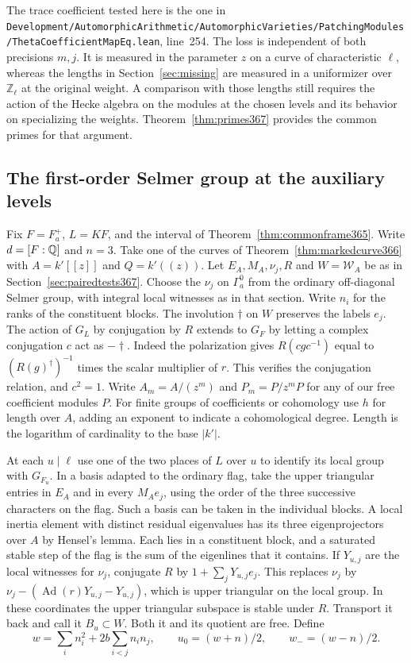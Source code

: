 \documentclass[a4paper,11pt]{article}
\theoremstyle{definition}
\theoremstyle{remark}
\newcommand{\ZZ}{\mathbb Z}\newcommand{\ord}{\operatorname{ord}}
\newcommand{\srcloc}[2]{{\small\nolinkurl{#1.lean}}, line~#2}
\numberwithin{equation}{section}
\begin{document}
The trace coefficient tested here is the one in
\srcloc{Development/AutomorphicArithmetic/AutomorphicVarieties/PatchingModules/ThetaCoefficientMapEq}{254}.
The loss is independent of both precisions \(m,j\). It is
measured in the parameter \(z\) on a curve of characteristic
\(\ell\), whereas the lengths in Section~\ref{sec:missing}
are measured in a uniformizer over \(\ZZ_\ell\) at the
original weight. A comparison with those lengths still
requires the action of the Hecke algebra on the modules at
the chosen levels and its behavior on specializing the
weights. Theorem~\ref{thm:primes367} provides the common
primes for that argument.


\subsection{The first-order Selmer group at the auxiliary levels}
\label{sec:selmerlength368}

Fix \(F=F_a^+\), \(L=KF\), and the interval of
Theorem~\ref{thm:commonframe365}. Write \(d=[F:\mathbb Q]\) and
\(n=3\). Take one of the curves of Theorem~\ref{thm:markedcurve366}
with \(A=k'[[z]]\) and \(Q=k'((z))\). Let \(E_A,M_A,\nu_j,R\)
and \(W=\mathcal W_A\) be as in Section~\ref{sec:pairedtests367}.
Choose the \(\nu_j\) on \(\Gamma_a^0\) from the ordinary
off-diagonal Selmer group, with integral local witnesses as in
that section. Write \(n_i\) for the ranks of the constituent
blocks. The involution \(\dagger\) on \(W\) preserves the labels
\(e_j\). The action of \(G_L\) by conjugation by \(R\) extends to
\(G_F\) by letting a complex conjugation \(c\) act as
\(-\dagger\). Indeed the polarization gives
\(R(cgc^{-1})\) equal to \((R(g)^\dagger)^{-1}\) times the
scalar multiplier of \(r\). This verifies the conjugation
relation, and \(c^2=1\). Write \(A_m=A/(z^m)\) and \(P_m=P/z^mP\)
for any of our free coefficient modules \(P\). For finite
groups of coefficients or cohomology use \(h\) for length over
\(A\), adding an exponent to indicate a cohomological degree.
Length is the logarithm of cardinality to the base \(|k'|\).

At each \(u\mid\ell\) use one of the two places of \(L\) over
\(u\) to identify its local group with \(G_{F_u}\). In a basis
adapted to the ordinary flag, take the upper triangular entries
in \(E_A\) and in every \(M_Ae_j\), using the order of the
three successive characters on the flag. Such a basis can be
taken in the individual blocks. A local inertia element with
distinct residual eigenvalues has its three eigenprojectors
over \(A\) by Hensel's lemma. Each lies in a constituent block,
and a saturated stable step of the flag is the sum of the
eigenlines that it contains. If \(Y_{u,j}\) are the local
witnesses for \(\nu_j\), conjugate \(R\) by
\(1+\sum_jY_{u,j}e_j\). This replaces \(\nu_j\) by
\(\nu_j-(\operatorname{Ad}(r)Y_{u,j}-Y_{u,j})\), which is
upper triangular on the local group. In these coordinates
the upper triangular subspace is stable under \(R\).
Transport it back and call it \(B_u\subset W\). Both it
and its quotient are free. Define
\[
 w=\sum_i n_i^2+2b\sum_{i<j}n_i n_j,\qquad
 u_0=(w+n)/2,\qquad w_-=(w-n)/2 .
\]
\end{document}
